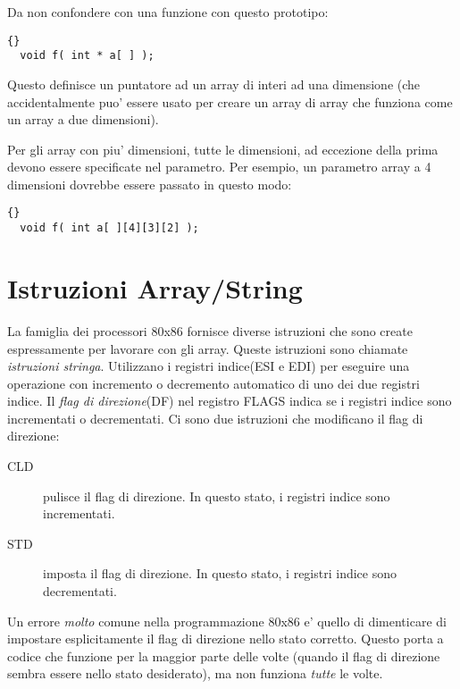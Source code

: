 Da non confondere con una funzione con questo prototipo:
\begin{lstlisting}[stepnumber=0]{}
  void f( int * a[ ] );
\end{lstlisting}
Questo definisce un puntatore ad un array di interi ad una dimensione (che
accidentalmente puo' essere usato per creare un array di array che funziona
come un array a due dimensioni).

Per gli array con piu' dimensioni, tutte le dimensioni, ad eccezione della
prima devono essere specificate nel parametro. Per esempio, un parametro
array a 4 dimensioni dovrebbe essere passato in questo modo:
\begin{lstlisting}[stepnumber=0]{}
  void f( int a[ ][4][3][2] );
\end{lstlisting}

\section{Istruzioni Array/String}

La famiglia dei processori 80x86 fornisce diverse istruzioni che sono
create espressamente per lavorare con gli array. Queste istruzioni sono
chiamate \emph{istruzioni stringa}. Utilizzano i registri indice(ESI e EDI)
per eseguire una operazione con incremento o decremento automatico di 
uno dei due registri indice. Il \emph{flag di direzione}(DF)
nel registro FLAGS indica se i registri indice sono incrementati o
decrementati. Ci sono due istruzioni che modificano il flag di direzione:
\begin{description}
\item[CLD]  pulisce il flag di direzione. In questo stato, i registri indice
					sono incrementati.
\item[STD]  imposta il flag di direzione. In questo stato, i registri indice
					sono decrementati.
\end{description}
Un errore \emph{molto} comune nella programmazione 80x86 e' quello di dimenticare
di impostare esplicitamente il flag di direzione nello stato corretto. Questo 
porta a codice che funzione per la maggior parte delle volte (quando il flag
di direzione sembra essere nello stato desiderato), ma non funziona \emph{tutte} le
volte.

